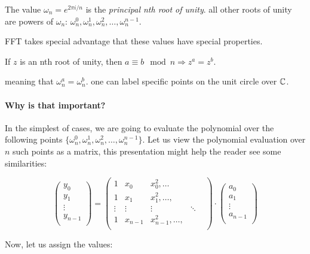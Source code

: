 The value $\omega_n=e^{2\pi i/n}$ is the \emph{principal nth root of unity}.
all other roots of unity are powers of $\omega_n$:
 $\omega_n^0, \omega_n^1, \omega_n^2,\dots, \omega_n^{n-1}$.

FFT takes special advantage that these values have special properties.
\begin{lemma}\label{roots-of-unity-property}
If $z$ is an nth root of unity, then $ a \equiv b \mod n \Rightarrow z^a = z^b$.
\end{lemma}
meaning that $\omega_n^a = \omega_n^b$. one can label specific points on the unit circle over $\mathbb{C}$.

\paragraph{Why is that important?}

In the simplest of cases, we are going to evaluate the polynomial over the following
points $ \{\omega_n^0, \omega_n^1, \omega_n^2,\dots, \omega_n^{n-1}\}$.
Let us view the polynomial evaluation over $n$ such points as a matrix, this presentation
might help the reader see some similarities:


$$
\begin{pmatrix}
  y_0\\
  y_1\\
  \vdots \\
  y_{n-1}\\
\end{pmatrix}
=
\begin{pmatrix}
  1 & x_0 & x_0^2 ,\dots\\
  1 & x_1 & x_1^2, \dots,\\
  \vdots & \vdots & \vdots & \ddots & \\
  1 & x_{n-1} & x_{n-1}^2, \dots,\\
 \end{pmatrix}
 \cdot 
\begin{pmatrix}
  a_0\\
  a_1\\
  \vdots \\
  a_{n-1}\\
\end{pmatrix}
 $$

 Now, let us assign the values:

